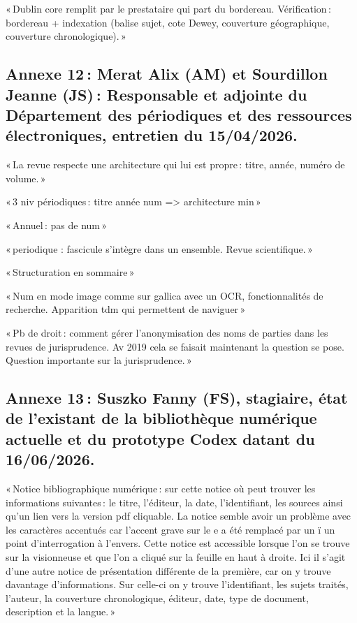 « Dublin core remplit par le prestataire qui part du bordereau. Vérification : bordereau + indexation (balise sujet, cote Dewey, couverture géographique, couverture chronologique). » 



\subsection*{Annexe 12 : Merat Alix (AM) et Sourdillon Jeanne (JS) : Responsable et adjointe du Département des périodiques et des ressources électroniques, entretien du 15/04/2026.} 

« La revue respecte une architecture qui lui est propre : titre, année, numéro de volume. » 

« 3 niv périodiques : titre année num => architecture min » 

« Annuel : pas de num » 

« periodique : fascicule s'intègre dans un ensemble. Revue scientifique. » 

« Structuration en sommaire » 

« Num en mode image comme sur gallica avec un OCR, fonctionnalités de recherche. Apparition tdm qui permettent de naviguer » 

« Pb de droit : comment gérer l’anonymisation des noms de parties dans les revues de jurisprudence. Av 2019 cela se faisait maintenant la question se pose. Question importante sur la jurisprudence. » 

\subsection*{Annexe 13 : Suszko Fanny (FS), stagiaire, état de l’existant de la bibliothèque numérique actuelle et du prototype Codex datant du 16/06/2026.}

« Notice bibliographique numérique : sur cette notice où peut trouver les informations suivantes : le titre, l’éditeur, la date, l’identifiant, les sources ainsi qu’un lien vers la version pdf cliquable. La notice semble avoir un problème avec les caractères accentués car l’accent grave sur le e a été remplacé par un ï un point d’interrogation à l’envers. Cette notice est accessible lorsque l’on se trouve sur la visionneuse et que l’on a cliqué sur la feuille en haut à droite. Ici il s’agit d’une autre notice de présentation différente de la première, car on y trouve davantage d’informations. Sur celle-ci on y trouve l’identifiant, les sujets traités, l’auteur, la couverture chronologique, éditeur, date, type de document, description et la langue. » 

